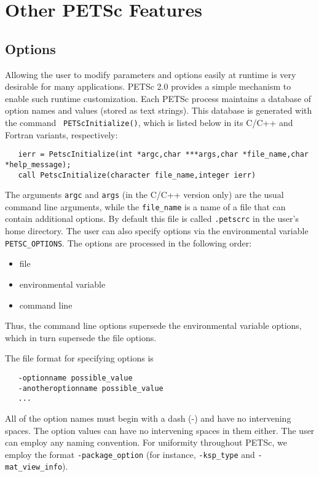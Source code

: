 \chapter{Other PETSc Features}

\section{Options}  
\label{sec:options}

Allowing the user to modify parameters and options easily at runtime
is very desirable for many applications. PETSc 2.0 provides a simple
mechanism to enable such runtime customization. Each PETSc process
maintains a database of option names and values (stored as text
strings). This database is generated with the command {\tt
PETScInitialize()}, which is listed below in its C/C++ and Fortran
variants, respectively:
\begin{verbatim}
   ierr = PetscInitialize(int *argc,char ***args,char *file_name,char *help_message);
   call PetscInitialize(character file_name,integer ierr)
\end{verbatim}
The arguments {\tt argc} and {\tt args} (in the C/C++ version only) are
the usual command line arguments, while the {\tt file\_name} is a name of
a file that can contain additional options. 
By default this file is called {\tt .petscrc}  in the 
user's home directory.  The user can also specify options via the
environmental variable {\tt PETSC\_OPTIONS}.   
The options are processed in the following order:
\begin{itemize}
\item file
\item environmental variable
\item command line
\end{itemize}
Thus, the command line options supersede the environmental variable
options, which in turn supersede the file options.

The file format for specifying options is 
\begin{verbatim}
   -optionname possible_value
   -anotheroptionname possible_value
   ...
\end{verbatim}
All of the option names must begin with a dash (-) and have no intervening 
spaces.  The option values can have no intervening spaces in them either.
The user can employ any naming convention.  For uniformity throughout
PETSc, we employ the format {\tt -package\_option} (for instance, 
{\tt -ksp\_type} and {\tt -mat\_view\_info}).

